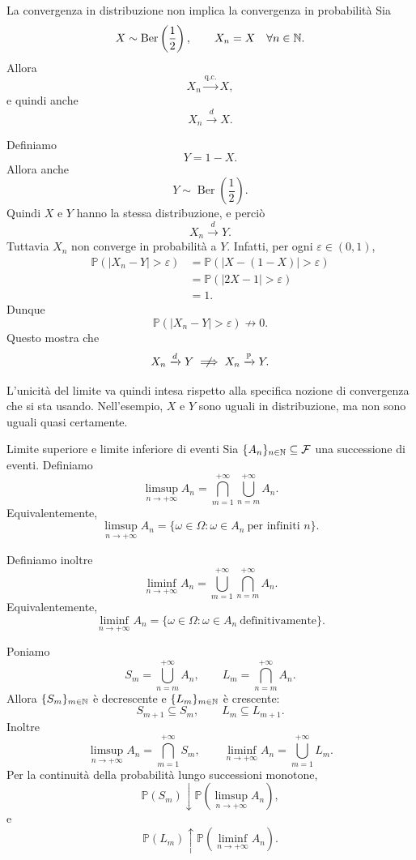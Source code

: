 \documentclass[a4paper]{article}
\begin{document}
\begin{snippetexample}{La convergenza in distribuzione non implica la convergenza in probabilità}
    Sia
    \[
        X\sim\operatorname{Ber}\left(\frac12\right),
        \qquad
        X_n=X
        \quad
        \forall n\in\mathbb{N}.
    \]
    Allora
    \[
        X_n\xrightarrow{\text{q.c.}}X,
    \]
    e quindi anche
    \[
        X_n\xrightarrow{d}X.
    \]

    Definiamo
    \[
        Y=1-X.
    \]
    Allora anche
    \[
        Y\sim\operatorname{Ber}\left(\frac12\right).
    \]
    Quindi \(X\) e \(Y\) hanno la stessa distribuzione, e perciò
    \[
        X_n\xrightarrow{d}Y.
    \]
    Tuttavia \(X_n\) non converge in probabilità a \(Y\). Infatti, per ogni \(\varepsilon\in(0,1)\),
    \begin{align*}
        \mathbb{P}(|X_n-Y|>\varepsilon)
        &=\mathbb{P}(|X-(1-X)|>\varepsilon)\\
        &=\mathbb{P}(|2X-1|>\varepsilon)\\
        &=1.
    \end{align*}
    Dunque
    \[
        \mathbb{P}(|X_n-Y|>\varepsilon)\not\longrightarrow 0.
    \]
    Questo mostra che
    \[
        X_n\xrightarrow{d}Y
        \centernot\implies
        X_n\xrightarrow{\mathbb{P}}Y.
    \]

    L'unicità del limite va quindi intesa rispetto alla specifica nozione di convergenza che si sta usando. Nell'esempio, \(X\) e \(Y\) sono uguali in distribuzione, ma non sono uguali quasi certamente.
\end{snippetexample}

\begin{snippetdefinition}{Limite superiore e limite inferiore di eventi}
    Sia \(\{A_n\}_{n\in\mathbb{N}}\subseteq\mathcal{F}\) una successione di eventi. Definiamo
    \[
        \limsup_{n\to+\infty}A_n
        =
        \bigcap_{m=1}^{+\infty}\bigcup_{n=m}^{+\infty}A_n.
    \]
    Equivalentemente,
    \[
        \limsup_{n\to+\infty}A_n
        =
        \{\omega\in\Omega:\omega\in A_n\ \text{per infiniti }n\}.
    \]

    Definiamo inoltre
    \[
        \liminf_{n\to+\infty}A_n
        =
        \bigcup_{m=1}^{+\infty}\bigcap_{n=m}^{+\infty}A_n.
    \]
    Equivalentemente,
    \[
        \liminf_{n\to+\infty}A_n
        =
        \{\omega\in\Omega:\omega\in A_n\ \text{definitivamente}\}.
    \]
\end{snippetdefinition}

Poniamo
\[
    S_m=\bigcup_{n=m}^{+\infty}A_n,
    \qquad
    L_m=\bigcap_{n=m}^{+\infty}A_n.
\]
Allora \(\{S_m\}_{m\in\mathbb{N}}\) è decrescente e \(\{L_m\}_{m\in\mathbb{N}}\) è crescente:
\[
    S_{m+1}\subseteq S_m,
    \qquad
    L_m\subseteq L_{m+1}.
\]
Inoltre
\[
    \limsup_{n\to+\infty}A_n
    =
    \bigcap_{m=1}^{+\infty}S_m,
    \qquad
    \liminf_{n\to+\infty}A_n
    =
    \bigcup_{m=1}^{+\infty}L_m.
\]
Per la continuità della probabilità lungo successioni monotone,
\[
    \mathbb{P}(S_m)\downarrow
    \mathbb{P}\left(\limsup_{n\to+\infty}A_n\right),
\]
e
\[
    \mathbb{P}(L_m)\uparrow
    \mathbb{P}\left(\liminf_{n\to+\infty}A_n\right).
\]
\end{document}
